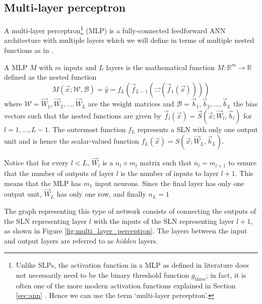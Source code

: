 \subsection{Multi-layer perceptron}
\label{sec:multi_layer_perceptron}
A multi-layer perceptron\footnote{Unlike SLPs, the activation function in a MLP as defined in literature does not necessarily need to be the binary threshold function $g_\text{thres}$; in fact, it is often one of the more modern activation functions explained in Section \ref{sec:ann} \cite{hastie2017,burkov2019}. Hence we can use the term `multi-layer perceptron'.} (MLP) is a fully-connected feedforward ANN architecture with multiple layers which we will define in terms of multiple nested functions as in \citet{burkov2019}.
\begin{definition}
    \label{def:mlp}
    A MLP $M$ with $m$ inputs and $L$ layers is the mathematical function
    $M : \mathbb{R}^m \rightarrow \mathbb{R}$ defined as the nested function
    \begin{equation}
        M(\vec{x}; \mathscr{W}, \mathscr{B})
            = \hat{y}
            = f_L \left(
                \vec{f}_{L-1} \left(
                    \vec{\dots} \left(
                        \vec{f}_1 \left(
                            \vec{x}
                        \right)
                    \right)
                \right)
            \right)
    \end{equation}
    where $\mathscr{W} = \vec{W}_1, \vec{W}_2, \dots, \vec{W}_L$ are the weight matrices and $\mathscr{B} = \vec{b}_1, \vec{b}_2, \dots, \vec{b}_L$ the bias vectors such that the nested functions are given by $\vec{f}_l(\vec{x}) = \vec{S}(\vec{x}; \vec{W}_l, \vec{b}_l)$ for $l = 1, \dots, L-1$. 
    The outermost function $f_L$ represents a SLN with only one output unit and is hence the scalar-valued function $f_L(\vec{x}) = S(\vec{x}; \vec{W}_L, \vec{b}_L)$.
    
\end{definition}

Notice that for every $l < L$, $\vec{W}_l$ is a $n_l \times m_l$ matrix such that $n_l=m_{l+1}$ to esnure that the number of outputs of layer $l$ is the number of inputs to layer $l+1$.
This means that the MLP has $m_1$ input neurons.
Since the final layer has only one output unit, $\vec{W}_L$ has only one row, and finally $n_L=1$

The graph representing this type of network consists of connecting the outputs of the SLN representing layer $l$ with the inputs of the SLN representing layer $l+1$, as shown in Figure \ref{fig:multi_layer_perceptron}. 
The layers between the input and output layers are referred to as \textit{hidden} layers.

